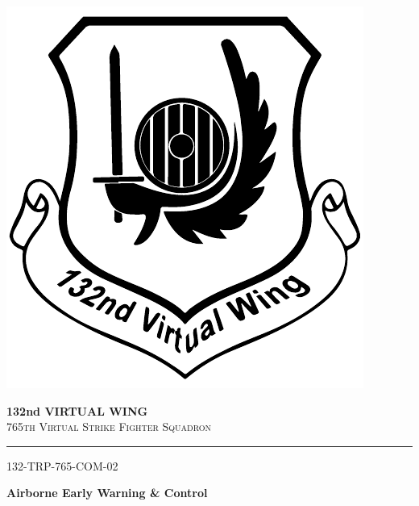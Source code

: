 \begin{titlepage}
	\begin{center}
    
        \begin{flushright}
        	\includegraphics[scale=0.3]{132nd.pdf}
        \end{flushright}
        
        \vspace*{-2cm}
        
        \begin{flushleft}
           	\large 
          	\textbf{132nd VIRTUAL WING} \\
            \normalsize
          	\textsc{765th Virtual Strike Fighter Squadron} \\
        \end{flushleft}
        
        \vspace*{0.35cm}
        
        \hrule
       	
        \vspace{1.5cm}
        
        \textsc{132-TRP-765-COM-02}
        
        \vspace{0.5cm}
        
        \Huge
    	\textbf{Airborne Early Warning \& Control}
        

\end{center}
\end{titlepage}

